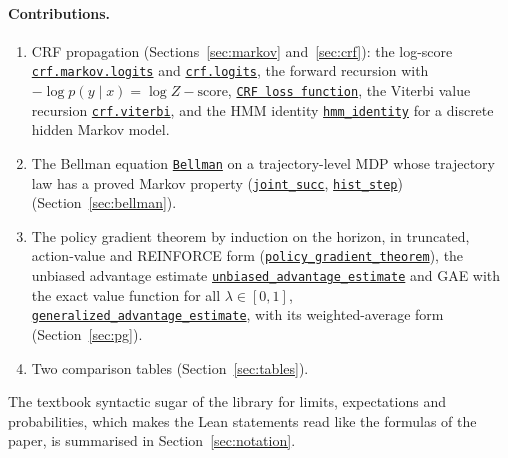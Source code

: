 \documentclass[11pt,a4paper]{article}
\newcommand{\lmod}[2]{\href{http://www.lemma.cn/lean/?module=#2}{\nolinkurl{#1}}}
\begin{document}
\paragraph{Contributions.}
\begin{enumerate}[leftmargin=1.6em,itemsep=0.25em]
  \item CRF propagation (Sections~\ref{sec:markov} and~\ref{sec:crf}): the log-score \lmod{crf.markov.logits}{Tensor.Eq.of.Ne_0.Eq.Eq.Eq.Eq_log.Eq_log.Eq_log} and \lmod{crf.logits}{Tensor.Imp.of.Eq}, the forward recursion with $-\log p(y\mid x)=\log Z-\text{score}$, \lmod{CRF loss function}{Random.All_Eq_AddLogSumExpAdd.All_EqNegLogProb.of.All_Eq_LogProbCond.All_Eq_LogProbCond.Eq_LogProbJoint.All_Lt0ProbJoint.IsDiscreteHMM}, the Viterbi value recursion \lmod{crf.viterbi}{Random.All_Eq_Add_MaxAdd.EqMax_ProbJoint.of.All_Eq_LogProbCond.All_Eq_LogProbCond.Eq_LogProbJoint.All_Lt0ProbJoint.IsDiscreteHMM}, and the HMM identity \lmod{hmm_identity}{Random.Sum_Mul_ProbCond.eq.Prob.of.IsDiscreteHMM} for a discrete hidden Markov model.
  \item The Bellman equation \lmod{Bellman}{Random.Eq_Expect.Eq_Expect.MEq_Expect.of.All_Eq_Expect.All_MEq_Expect.CondIndep.All_Measurable.GtInftySup.All_MeasurableJoint.In_Ico} on a trajectory-level MDP whose trajectory law has a proved Markov property (\lmod{joint_succ}{Random.Map}, \lmod{hist_step}{Random.Integral.of.All_LeNorm.StronglyMeasurable.history}) (Section~\ref{sec:bellman}).
  \item The policy gradient theorem by induction on the horizon, in truncated, action-value and REINFORCE form (\lmod{policy_gradient_theorem}{Tensor.Eq.Dot.Grad.Expect.of.Eq_Conditioned.GtInftySup.policy_gradient_theorem}), the unbiased advantage estimate \lmod{unbiased_advantage_estimate}{Tensor.EqDot_GradExpect.of.Eq_Conditioned.Eq_Expect.All_Differentiable_Prob.GtInftySup.unbiased_advantage_estimate} and GAE with the exact value function for all $\lambda\in[0,1]$, \lmod{generalized_advantage_estimate}{Tensor.EqDot_GradExpect.of.Eq_Conditioned.Eq_Expect.All_Differentiable_Prob.GtInftySup.generalized_advantage_estimate}, with its weighted-average form (Section~\ref{sec:pg}).
  \item Two comparison tables (Section~\ref{sec:tables}).
\end{enumerate}
The textbook syntactic sugar of the library for limits, expectations and probabilities, which makes the Lean statements read like the formulas of the paper, is summarised in Section~\ref{sec:notation}.
\end{document}
